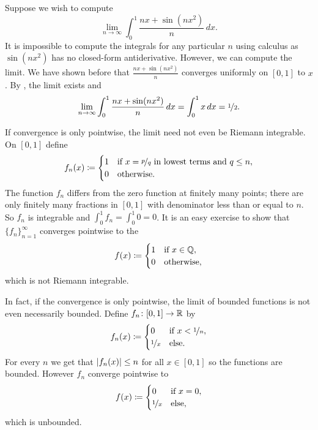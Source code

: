 \begin{example}
Suppose we wish to compute
\begin{equation*}
\lim_{n\to\infty} \int_0^1 \frac{nx+ \sin(nx^2)}{n} \,dx .
\end{equation*}
It is impossible to compute the integrals for any particular $n$ using 
calculus as $\sin(nx^2)$ has no closed-form antiderivative.  However,
we can compute the limit.
We have shown before that $\frac{nx+ \sin(nx^2)}{n}$ converges uniformly
on $[0,1]$ to $x$.
By , the limit exists and
\begin{equation*}
\lim_{n\to\infty} \int_0^1 \frac{nx+ \sin(nx^2)}{n} \,dx
=
\int_0^1
x \,dx = \nicefrac{1}{2} .
\end{equation*}
\end{example}

\begin{example}
If convergence is only pointwise, the limit need not even be Riemann
integrable.  On $[0,1]$ define
\begin{equation*}
f_n(x) \coloneqq
\begin{cases}
1 & \text{if } x = \nicefrac{p}{q} \text{ in lowest terms and } q \leq n, \\
0 & \text{otherwise.}
\end{cases}
\end{equation*}
The function $f_n$ differs from the zero function at finitely many points;
there are only finitely many fractions in $[0,1]$ with denominator less than
or equal to $n$.   So $f_n$ is integrable and $\int_0^1 f_n = \int_0^1 0 =
0$.  It is an easy exercise to show that $\{ f_n \}_{n=1}^\infty$ converges pointwise to the
\begin{equation*}
f(x) \coloneqq
\begin{cases}
1 & \text{if } x \in {\mathbb{Q}}, \\
0 & \text{otherwise,}
\end{cases}
\end{equation*}
which is not Riemann integrable.
\end{example}

\begin{example}
In fact, if the convergence is only pointwise, the limit of bounded
functions is not even necessarily bounded.
Define $f_n \colon [0,1] \to {\mathbb{R}}$ by
\begin{equation*}
f_n(x) \coloneqq
\begin{cases}
0 & \text{if } x < \nicefrac{1}{n},\\
\nicefrac{1}{x} & \text{else.}
\end{cases}
\end{equation*}
For every $n$ we get that $\left\lvert {f_n(x)} \right\rvert \leq n$ for all $x \in [0,1]$ so the
functions are bounded.  However $f_n$ converge pointwise to
\begin{equation*}
f(x) \coloneqq
\begin{cases}
0 & \text{if } x = 0,\\
\nicefrac{1}{x} & \text{else,}
\end{cases}
\end{equation*}
which is unbounded.
\end{example}

